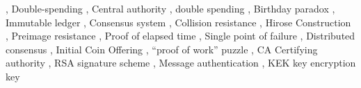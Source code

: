 \documentclass[
  10pt,
  a4paper,
]{article}
\begin{document}
\begin{multicols*}{2}
{\vspace{2mm}\color{NavyBlue!70},\vspace{2mm}} Double-spending
{\vspace{2mm}\color{NavyBlue!70},\vspace{2mm}} Central authority
{\vspace{2mm}\color{NavyBlue!70},\vspace{2mm}} double spending
{\vspace{2mm}\color{NavyBlue!70},\vspace{2mm}} Birthday paradox
{\vspace{2mm}\color{NavyBlue!70},\vspace{2mm}} Immutable ledger
{\vspace{2mm}\color{NavyBlue!70},\vspace{2mm}} Consensus system
{\vspace{2mm}\color{NavyBlue!70},\vspace{2mm}} Collision resistance
{\vspace{2mm}\color{NavyBlue!70},\vspace{2mm}} Hirose Construction
{\vspace{2mm}\color{NavyBlue!70},\vspace{2mm}} Preimage resistance
{\vspace{2mm}\color{NavyBlue!70},\vspace{2mm}} Proof of elapsed time
{\vspace{2mm}\color{NavyBlue!70},\vspace{2mm}} Single point of failure
{\vspace{2mm}\color{NavyBlue!70},\vspace{2mm}} Distributed consensus
{\vspace{2mm}\color{NavyBlue!70},\vspace{2mm}} Initial Coin Offering
{\vspace{2mm}\color{NavyBlue!70},\vspace{2mm}} ``proof of work'' puzzle
{\vspace{2mm}\color{NavyBlue!70},\vspace{2mm}} CA Certifying authority
{\vspace{2mm}\color{NavyBlue!70},\vspace{2mm}} RSA signature scheme
{\vspace{2mm}\color{NavyBlue!70},\vspace{2mm}} Message authentication
{\vspace{2mm}\color{NavyBlue!70},\vspace{2mm}} KEK key encryption key

\end{multicols*}
\end{document}
